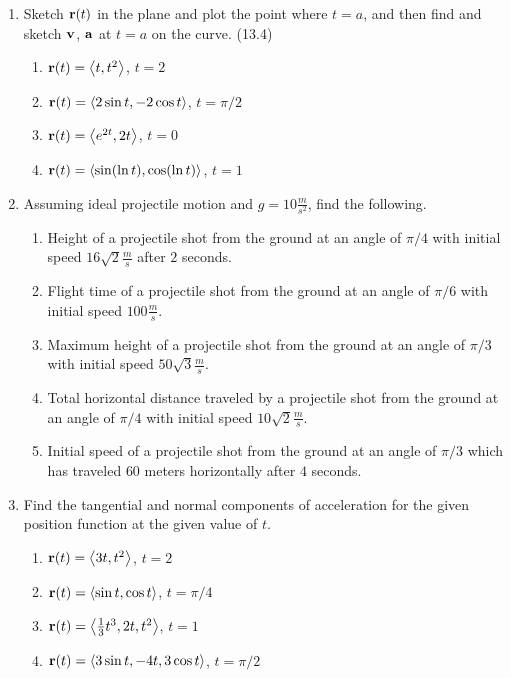 \begin{enumerate}
    \item Sketch $\mathbf{r}(t)$ in the plane and plot the point where $t=a$, and then find and sketch $\mathbf{v}$, $\mathbf{a}$ at $t=a$ on the curve. (13.4)

      \begin{enumerate}
        \item $\mathbf{r}(t) = \left<t, t^2\right>$, $t=2$
        \item $\mathbf{r}(t) = \left<2\sin t,-2\cos t\right>$, $t=\pi/2$
        \item $\mathbf{r}(t) = \left<e^{2t},2t\right>$, $t=0$
        \item $\mathbf{r}(t) = \left<\sin(\ln t),\cos(\ln t)\right>$, $t=1$
      \end{enumerate}

    \item Assuming ideal projectile motion and $g=10\frac{m}{s^2}$, find the following.

      \begin{enumerate}
        \item Height of a projectile shot from the ground at an angle of $\pi/4$ with initial speed $16\sqrt{2}\frac{m}{s}$ after $2$ seconds.
        \item Flight time of a projectile shot from the ground at an angle of $\pi/6$ with initial speed $100\frac{m}{s}$.
        \item Maximum height of a projectile shot from the ground at an angle of $\pi/3$ with initial speed $50\sqrt{3}\frac{m}{s}$.
        \item Total horizontal distance traveled by a projectile shot from the ground at an angle of $\pi/4$ with initial speed $10\sqrt{2}\frac{m}{s}$.
        \item Initial speed of a projectile shot from the ground at an angle of $\pi/3$ which has traveled $60$ meters horizontally after $4$ seconds.
      \end{enumerate}

    \newpage

    \item Find the tangential and normal components of acceleration for the given position function at the given value of $t$.

      \begin{enumerate}%
        \item $\mathbf{r}(t) = \left<3t,t^2\right>$, $t=2$
        \item $\mathbf{r}(t) = \left<\sin t, \cos t\right>$, $t=\pi/4$
        \item $\mathbf{r}(t) = \left<\frac{1}{3}t^3,2t,t^2\right>$, $t=1$
        \item $\mathbf{r}(t) = \left< 3\sin t, -4t, 3\cos t \right>$, $t=\pi/2$
      \end{enumerate}


\end{enumerate}
